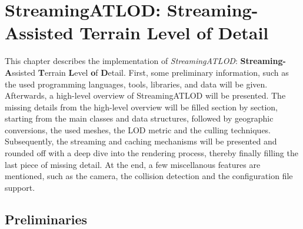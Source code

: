\chapter{StreamingATLOD: Streaming-Assisted Terrain Level of Detail}
\fancyhf{}


This chapter describes the implementation of \textit{StreamingATLOD}: \textbf{Streaming-A}ssisted 
\textbf{T}errain \textbf{L}evel \textbf{o}f \textbf{D}etail.
First, some preliminary information, such as 
the used programming languages, tools, libraries, and data will be given.
Afterwards, a high-level overview of StreamingATLOD will be presented.
The missing details from the high-level overview will be filled section 
by section, starting from the main classes and data structures,
followed by geographic conversions, the used meshes, the LOD metric and the culling techniques.
Subsequently, the streaming and caching mechanisms will be presented 
and rounded off with a deep dive into the rendering process, thereby finally filling 
the last piece of missing detail. At the end, a few miscellanous features 
are mentioned, such as the camera, the collision detection and the configuration file support.

\section{Preliminaries}
